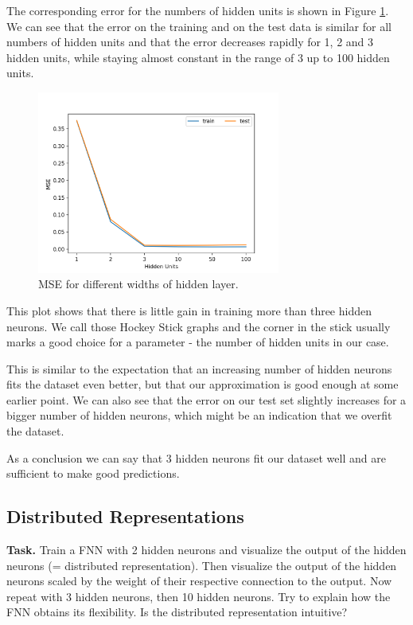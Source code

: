 \documentclass{support/acm_proc_article-sp}
\begin{document}
    The corresponding error for the numbers of hidden units is shown in Figure \ref{fig:nn-error}.
    We can see that the error on the training and on the test data is similar for all numbers of hidden units and that
    the error decreases rapidly for 1, 2 and 3 hidden units, while staying almost constant in the range of 3 up to 100
    hidden units.
    \begin{figure}[!htbp]
        \centering
        \includegraphics[width=8cm]{images/nn-error.png}
        \caption{MSE for different widths of hidden layer.}
        \label{fig:nn-error}
    \end{figure}

    This plot shows that there is little gain in training more than three hidden neurons.
    We call those Hockey Stick graphs and the corner in the stick usually marks a good choice for a parameter - the
    number of hidden units in our case.

    This is similar to the expectation that an increasing number of hidden neurons fits the dataset even better,
    but that our approximation is good enough at some earlier point.
    We can also see that the error on our test set slightly increases for a bigger number of hidden neurons, which
    might be an indication that we overfit the dataset.

    As a conclusion we can say that 3 hidden neurons fit our dataset well and are sufficient to make good predictions.


    \subsection{Distributed Representations}

    \textbf{Task.} Train a FNN with 2 hidden neurons and visualize the output of the hidden neurons (= distributed representation).
    Then visualize the output of the hidden neurons scaled by the weight of their respective connection to the output.
    Now repeat with 3 hidden neurons, then 10 hidden neurons.
    Try to explain how the FNN obtains its flexibility.
    Is the distributed representation intuitive?
\end{document}
